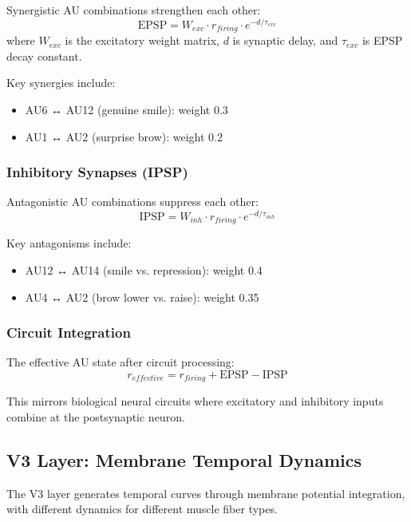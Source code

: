 \documentclass[preprint,12pt]{elsarticle}
\begin{document}
Synergistic AU combinations strengthen each other:
\begin{equation}
\text{EPSP} = W_{exc} \cdot r_{firing} \cdot e^{-d/\tau_{exc}}
\end{equation}
where $W_{exc}$ is the excitatory weight matrix, $d$ is synaptic delay,
and $\tau_{exc}$ is EPSP decay constant.

Key synergies include:
\begin{itemize}
\item AU6 ↔ AU12 (genuine smile): weight 0.3
\item AU1 ↔ AU2 (surprise brow): weight 0.2
\end{itemize}

\subsubsection{Inhibitory Synapses (IPSP)}

Antagonistic AU combinations suppress each other:
\begin{equation}
\text{IPSP} = W_{inh} \cdot r_{firing} \cdot e^{-d/\tau_{inh}}
\end{equation}

Key antagonisms include:
\begin{itemize}
\item AU12 ↔ AU14 (smile vs. repression): weight 0.4
\item AU4 ↔ AU2 (brow lower vs. raise): weight 0.35
\end{itemize}

\subsubsection{Circuit Integration}

The effective AU state after circuit processing:
\begin{equation}
r_{effective} = r_{firing} + \text{EPSP} - \text{IPSP}
\end{equation}

This mirrors biological neural circuits where excitatory and inhibitory
inputs combine at the postsynaptic neuron.

\subsection{V3 Layer: Membrane Temporal Dynamics}
\label{sec:v3}

The V3 layer generates temporal curves through membrane potential integration,
with different dynamics for different muscle fiber types.
\end{document}
